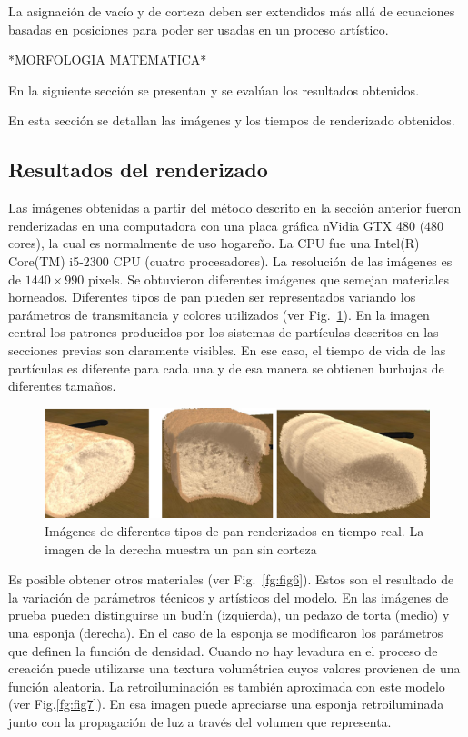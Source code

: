 \documentclass[spanish,a4paper,openright,11pt]{book}
\begin{document}
La asignación de vacío y de corteza deben ser extendidos más allá de ecuaciones basadas en posiciones para poder ser usadas en un proceso artístico.

*MORFOLOGIA MATEMATICA*


En la siguiente sección se presentan y se evalúan los resultados obtenidos.

En esta sección se detallan las imágenes y los tiempos de renderizado obtenidos. 

\subsection{Resultados del renderizado}

Las imágenes obtenidas a partir del método descrito en la sección anterior fueron renderizadas en una computadora con una placa gráfica nVidia GTX 480 ($480$ cores), la cual es normalmente de uso hogareño. La CPU fue una Intel(R) Core(TM) i5-2300 CPU (cuatro procesadores). La resolución de las imágenes es de $1440\times990$ pixels. 
Se obtuvieron diferentes imágenes que semejan materiales horneados. Diferentes tipos de pan pueden ser representados variando los parámetros de transmitancia y colores utilizados (ver Fig.~\ref{fg:fig5}). En la imagen central los patrones producidos por los sistemas de partículas descritos en las secciones previas son claramente visibles. En ese caso, el tiempo de vida de las partículas es diferente para cada una y de esa manera se obtienen burbujas de
diferentes tamaños.

\begin{figure}[htb!]
  \centerline{\includegraphics[scale=0.3]{fig5}}
  \caption{Imágenes de diferentes tipos de pan renderizados en tiempo real. La imagen de la derecha muestra un pan sin corteza}
  \label{fg:fig5}
\end{figure}

Es posible obtener otros materiales (ver Fig.~\ref{fg:fig6}). Estos son el resultado de la variación de parámetros técnicos y artísticos del modelo. En las imágenes de prueba pueden distinguirse un budín (izquierda), un pedazo de torta (medio) y una esponja (derecha). En el caso de la esponja se modificaron los parámetros que definen la función de densidad. Cuando no hay levadura en el proceso de creación puede utilizarse una textura volumétrica cuyos valores provienen de una función aleatoria. La retroiluminación es también aproximada con este modelo (ver Fig.\ref{fg:fig7}). En esa imagen puede apreciarse una esponja retroiluminada junto con la propagación de luz a través del volumen que representa.
\end{document}
